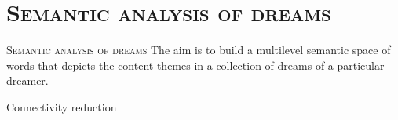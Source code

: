 \documentclass[xcolor=x11names,compress]{beamer}
\begin{document}
\section{\scshape Semantic analysis of dreams}
{
\begin{frame}[c]{}
    \centering
    {\scshape \LARGE \color{redUnicam} Semantic analysis of dreams} \newline \newline
    {The aim is to build a multilevel semantic space of words that depicts the content themes in a collection of
    dreams of a particular dreamer.}
\end{frame}}

{
\begin{frame}[t]{Connectivity reduction}
    
\end{frame}}
\end{document}
